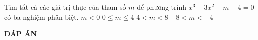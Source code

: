 \begin{ex}%
Tìm tất cả các giá trị thực của tham số $m$ để phương trình $x^3-3x^2-m-4=0$ có ba nghiệm phân biệt.
\choice
{$m<0$}
{$0\leq m\leq 4$}
{$4<m<8$}
{\True $-8<m<-4$}
\end{ex}


\newpage
\begin{center}
	\textbf{ĐÁP ÁN}
\end{center}
\begin{multicols}{10}
	
\end{multicols}


